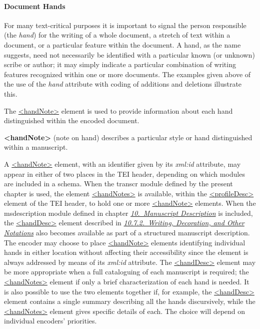 \paragraph[{Document Hands}]{Document Hands}\label{PHDH}\par
For many text-critical purposes it is important to signal the person responsible (the \textit{hand}) for the writing of a whole document, a stretch of text within a document, or a particular feature within the document. A hand, as the name suggests, need not necessarily be identified with a particular known (or unknown) scribe or author; it may simply indicate a particular combination of writing features recognized within one or more documents. The examples given above of the use of the {\itshape hand} attribute with coding of additions and deletions illustrate this.\par
The \hyperref[TEI.handNote]{<handNote>} element is used to provide information about each hand distinguished within the encoded document. 
\begin{sansreflist}
  
\item [\textbf{<handNote>}] (note on hand) describes a particular style or hand distinguished within a manuscript.
\end{sansreflist}
\par
A \hyperref[TEI.handNote]{<handNote>} element, with an identifier given by its {\itshape xml:id} attribute, may appear in either of two places in the TEI header, depending on which modules are included in a schema. When the \textsf{transcr} module defined by the present chapter is used, the element \hyperref[TEI.handNotes]{<handNotes>} is available, within the \hyperref[TEI.profileDesc]{<profileDesc>} element of the TEI header, to hold one or more \hyperref[TEI.handNote]{<handNote>} elements. When the \textsf{msdescription} module defined in chapter \textit{\hyperref[MS]{10.\ Manuscript Description}} is included, the \hyperref[TEI.handDesc]{<handDesc>} element described in \textit{\hyperref[msph2]{10.7.2.\ Writing, Decoration, and Other Notations}} also becomes available as part of a structured manuscript description. The encoder may choose to place \hyperref[TEI.handNote]{<handNote>} elements identifying individual hands in either location without affecting their accessibility since the element is always addressed by means of its {\itshape xml:id} attribute. The \hyperref[TEI.handDesc]{<handDesc>} element may be more appropriate when a full cataloguing of each manuscript is required; the \hyperref[TEI.handNotes]{<handNotes>} element if only a brief characterization of each hand is needed. It is also possible to use the two elements together if, for example, the \hyperref[TEI.handDesc]{<handDesc>} element contains a single summary describing all the hands discursively, while the \hyperref[TEI.handNotes]{<handNotes>} element gives specific details of each. The choice will depend on individual encoders' priorities.\par
